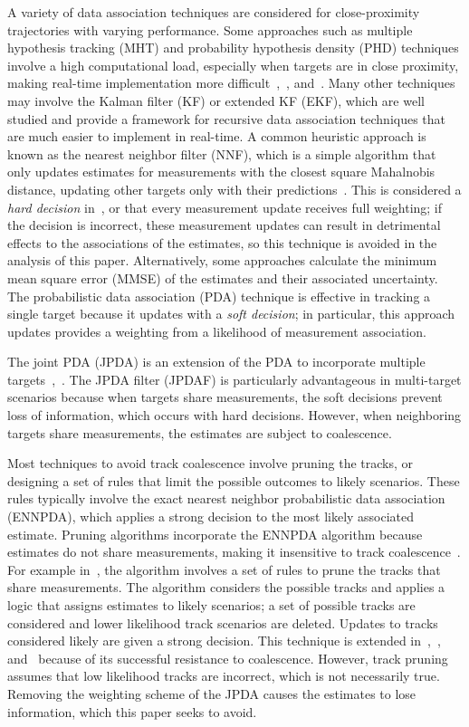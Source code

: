 \documentclass[letterpaper, 10pt, conference]{ieeeconf}
\begin{document}
A variety of data association techniques are considered for close-proximity trajectories with varying performance.
Some approaches such as multiple hypothesis tracking (MHT) and probability hypothesis density (PHD) techniques involve a high computational load, especially when targets are in close proximity, making real-time implementation more difficult~\cite{MHT1},~\cite{PHD1}, and~\cite{PHD2}.
Many other techniques may involve the Kalman filter (KF) or extended KF (EKF), which are well studied and provide a framework for recursive data association techniques that are much easier to implement in real-time.
A common heuristic approach is known as the nearest neighbor filter (NNF), which is a simple algorithm that only updates estimates for measurements with the closest square Mahalnobis distance, updating other targets only with their predictions~\cite{NN2}.
This is considered a \emph{hard decision} in~\cite{JPDAF1}, or that every measurement update receives full weighting; if the decision is incorrect, these measurement updates can result in detrimental effects to the associations of the estimates, so this technique is avoided in the analysis of this paper.
Alternatively, some approaches calculate the minimum mean square error (MMSE) of the estimates and their associated uncertainty.
The probabilistic data association (PDA) technique is effective in tracking a single target because it updates with a \emph{soft decision}; in particular, this approach updates provides a weighting from a likelihood of measurement association.

The joint PDA (JPDA) is an extension of the PDA to incorporate multiple targets~\cite{JPDAF1},~\cite{TrackDataAssoc}.
The JPDA filter (JPDAF) is particularly advantageous in multi-target scenarios because when targets share measurements, the soft decisions prevent loss of information, which occurs with hard decisions.
However, when neighboring targets share measurements, the estimates are subject to coalescence.

Most techniques to avoid track coalescence involve pruning the tracks, or designing a set of rules that limit the possible outcomes to likely scenarios. These rules typically involve the exact nearest neighbor probabilistic data association (ENNPDA), which applies a strong decision to the most likely associated estimate. Pruning algorithms incorporate the ENNPDA algorithm because  estimates do not share measurements, making it insensitive to track coalescence~\cite{Coal1}. For example in~\cite{Fitzgerald}, the algorithm involves a set of rules to prune the tracks that share measurements. The algorithm considers the possible tracks and applies a logic that assigns estimates to likely scenarios; a set of possible tracks are considered and lower likelihood track scenarios are deleted. Updates to tracks considered likely are given a strong decision. This technique is extended in~\cite{Coal_d},~\cite{Coal_e}, and~\cite{Coal_c} because of its successful resistance to coalescence. However, track pruning assumes that low likelihood tracks are incorrect, which is not necessarily true. Removing the weighting scheme of the JPDA causes the estimates to lose information, which this paper seeks to avoid.
\end{document}
